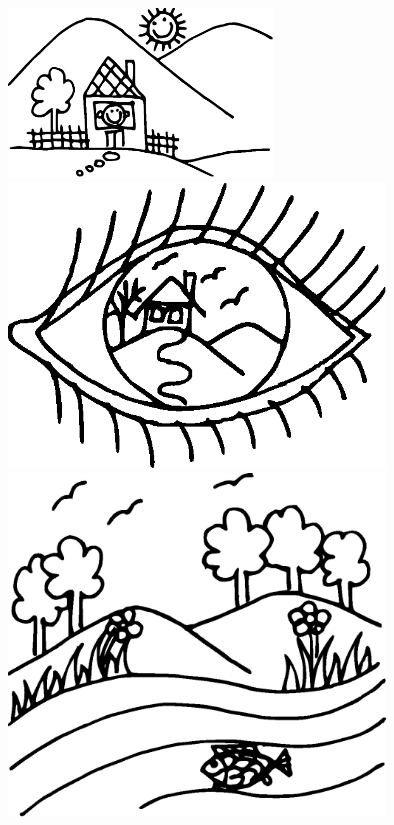 \documentclass[11pt,a4paper,twoside]{article}
\begin{document}
\vfil
\vspace*{-0.5cm}\hspace*{7cm}\includegraphics[width=7cm]{10.eps}\vspace*{-1cm}
\vfil
\pagebreak
\vfil
\hspace*{2cm}\includegraphics[width=10cm]{11.eps}
\vfil
\pagebreak
\pagebreak
  \pagebreak
\pagebreak
\vfil
\hspace*{2cm}\includegraphics[width=10cm]{12.eps}
\end{document}
